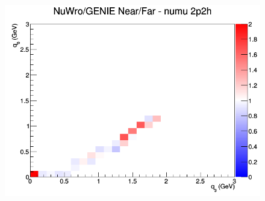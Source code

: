 \begin{figure}[h]
\endminipage
{}
\includegraphics[width=\linewidth]{q0_q3/nominal/ratios/2p2h_NuWro_GENIE_numu_NF_q3_q0.png}
\endminipage
\newline
\end{figure}
\clearpage
